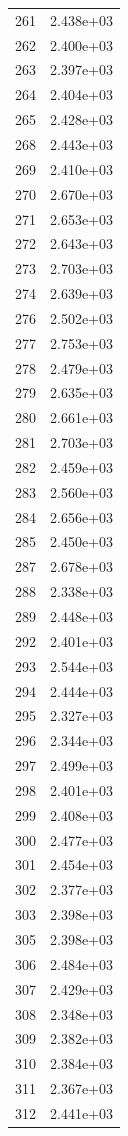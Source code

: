 \documentclass[12pt]{article}
\begin{document}
\begin{longtable}{@{}cc@{}}
261 & 2.438e+03 \\
262 & 2.400e+03 \\
263 & 2.397e+03 \\
264 & 2.404e+03 \\
265 & 2.428e+03 \\
268 & 2.443e+03 \\
269 & 2.410e+03 \\
270 & 2.670e+03 \\
271 & 2.653e+03 \\
272 & 2.643e+03 \\
273 & 2.703e+03 \\
274 & 2.639e+03 \\
276 & 2.502e+03 \\
277 & 2.753e+03 \\
278 & 2.479e+03 \\
279 & 2.635e+03 \\
280 & 2.661e+03 \\
281 & 2.703e+03 \\
282 & 2.459e+03 \\
283 & 2.560e+03 \\
284 & 2.656e+03 \\
285 & 2.450e+03 \\
287 & 2.678e+03 \\
288 & 2.338e+03 \\
289 & 2.448e+03 \\
292 & 2.401e+03 \\
293 & 2.544e+03 \\
294 & 2.444e+03 \\
295 & 2.327e+03 \\
296 & 2.344e+03 \\
297 & 2.499e+03 \\
298 & 2.401e+03 \\
299 & 2.408e+03 \\
300 & 2.477e+03 \\
301 & 2.454e+03 \\
302 & 2.377e+03 \\
303 & 2.398e+03 \\
305 & 2.398e+03 \\
306 & 2.484e+03 \\
307 & 2.429e+03 \\
308 & 2.348e+03 \\
309 & 2.382e+03 \\
310 & 2.384e+03 \\
311 & 2.367e+03 \\
312 & 2.441e+03 \\

\end{longtable}
\end{document}
